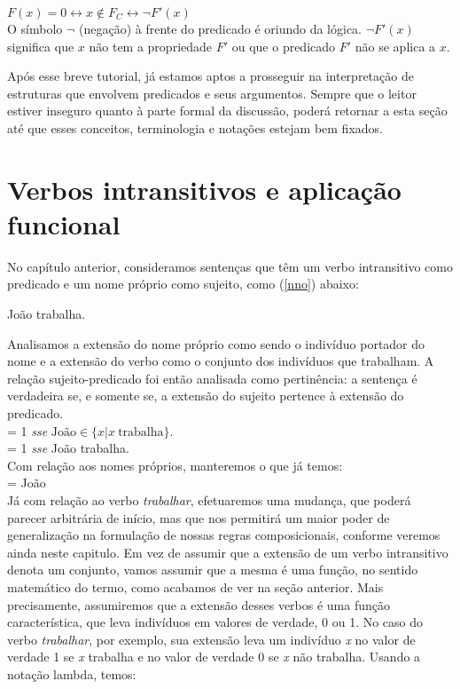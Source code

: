 \n $F(x)=0 \leftrightarrow x \notin F_C \leftrightarrow \neg F'(x)$\\

\n O símbolo $\neg$ (negação) à frente do predicado é oriundo da lógica. $\neg F'(x)$ significa que $x$ não tem a propriedade $F'$ ou que o predicado $F'$ não se aplica a $x$. 
 

Após esse breve tutorial, já estamos aptos a prosseguir na interpretação de estruturas que envolvem predicados e seus argumentos. Sempre que o leitor estiver inseguro quanto à parte formal da discussão, poderá retornar a esta seção até que esses conceitos, terminologia e notações estejam bem fixados.


\section{Verbos intransitivos e aplicação funcional}

No capítulo anterior, consideramos sentenças que têm um verbo intransitivo como predicado e um nome próprio como sujeito, como (\ref{nno}) abaixo:

\begin{exe}
	\ex João trabalha.\label{nno}
\end{exe}

\n Analisamos a extensão do nome próprio como sendo o indivíduo portador do nome e a extensão do verbo como o conjunto dos indivíduos que trabalham. A relação sujeito-predicado foi então analisada como pertinência: a sentença é verdadeira se, e somente se, a extensão do sujeito pertence à extensão do predicado. \\

\n {}  = 1 \textit{sse} $\text{João} \in \{x | x\ \text{trabalha}\}$.\\

\n {}  = 1 \textit{sse} João trabalha.\\

\noindent Com relação aos nomes próprios, manteremos o que já temos:\\

\noindent {} = João\\

Já com relação ao verbo \textit{trabalhar}, efetuaremos uma mudança, que poderá parecer arbitrária de início, mas que nos permitirá um maior poder de generalização na formulação de nossas regras composicionais, conforme veremos ainda neste capitulo. Em vez de assumir que a extensão de um verbo intransitivo denota um conjunto, vamos assumir que a mesma é uma função, no sentido matemático do termo, como acabamos de ver na seção anterior. Mais precisamente, assumiremos que a extensão desses verbos é uma função característica, que leva indivíduos em valores de verdade, 0 ou 1. No caso do verbo \textit{trabalhar}, por exemplo, sua extensão leva um indivíduo \textit{x} no valor de verdade 1 se \textit{x} trabalha e
no valor de verdade 0 se \textit{x} não trabalha. Usando a notação lambda, temos:\\

